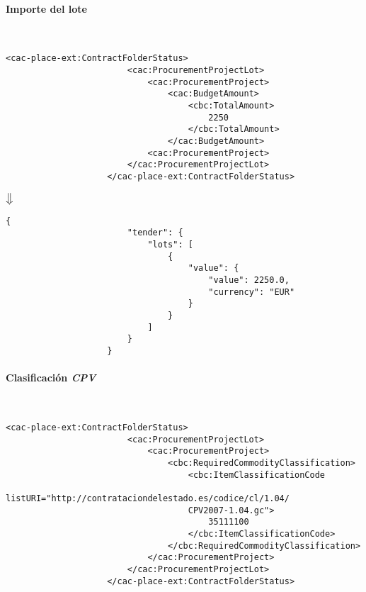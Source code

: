             \paragraph{Importe del lote} \mbox{}\\
                \begin{lstlisting}[language=lXML]
                    <cac-place-ext:ContractFolderStatus>
                        <cac:ProcurementProjectLot>
                            <cac:ProcurementProject>
                                <cac:BudgetAmount>
                                    <cbc:TotalAmount>
                                        2250
                                    </cbc:TotalAmount>
                                </cac:BudgetAmount>
                            <cac:ProcurementProject>
                        </cac:ProcurementProjectLot>
                    </cac-place-ext:ContractFolderStatus>
                \end{lstlisting}
                
                \begin{center}
                    $\big\Downarrow$
                \end{center}
\newpage
                \begin{lstlisting}[language=lJSON]
                    {
                        "tender": {
                            "lots": [
                                {
                                    "value": {
                                        "value": 2250.0,
                                        "currency": "EUR"
                                    }
                                }
                            ]
                        }
                    }
                \end{lstlisting}
                
            \paragraph{Clasificación \textit{CPV}} \mbox{}\\
                \begin{lstlisting}[language=lXML]
                    <cac-place-ext:ContractFolderStatus>
                        <cac:ProcurementProjectLot>
                            <cac:ProcurementProject>
                                <cbc:RequiredCommodityClassification>
                                    <cbc:ItemClassificationCode 
                                    listURI="http://contrataciondelestado.es/codice/cl/1.04/
                                    CPV2007-1.04.gc">
                                        35111100
                                    </cbc:ItemClassificationCode>
                                </cbc:RequiredCommodityClassification>
                            </cac:ProcurementProject>
                        </cac:ProcurementProjectLot>
                    </cac-place-ext:ContractFolderStatus>
                \end{lstlisting}
                
